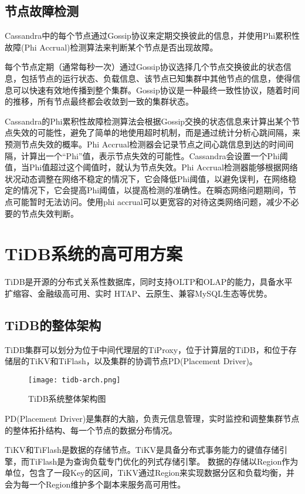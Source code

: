 \subsection{节点故障检测}

Cassandra中的每个节点通过Gossip协议来定期交换彼此的信息，并使用Phi累积性故障(Phi Accrual)检测算法\cite{hayashibara2004spl}来判断某个节点是否出现故障。

每个节点定期（通常每秒一次）通过Gossip协议选择几个节点交换彼此的状态信息，包括节点的运行状态、负载信息、该节点已知集群中其他节点的信息，使得信息可以快速有效地传播到整个集群。Gossip协议是一种最终一致性协议，随着时间的推移，所有节点最终都会收敛到一致的集群状态。

Cassandra的Phi累积性故障检测算法会根据Gossip交换的状态信息来计算出某个节点失效的可能性，避免了简单的地使用超时机制，而是通过统计分析心跳间隔，来预测节点失效的概率。Phi Accrual检测器会记录节点之间心跳信息到达的时间间隔，计算出一个“Phi”值，表示节点失效的可能性。Cassandra会设置一个Phi阈值，当Phi值超过这个阈值时，就认为节点失效。Phi Accrual检测器能够根据网络状况动态调整在网络不稳定的情况下，它会降低Phi阈值，以避免误判，在网络稳定的情况下，它会提高Phi阈值，以提高检测的准确性。在瞬态网络问题期间，节点可能暂时无法访问。使用phi accrual可以更宽容的对待这类网络问题，减少不必要的节点失效判断。


\section{TiDB系统的高可用方案}
TiDB\cite{huang2020tidb}是开源的分布式关系性数据库，同时支持OLTP和OLAP的能力，具备水平扩缩容、金融级高可用、实时 HTAP、云原生、兼容MySQL生态等优势。

\subsection{TiDB的整体架构}

TiDB集群可以划分为位于中间代理层的TiProxy，位于计算层的TiDB，和位于存储层的TiKV和TiFlash，以及集群的协调节点PD(Placement Driver)。

\begin{figure}
  \centering
  \texttt{[image: tidb-arch.png]}
  \caption{TiDB系统整体架构图}
  \label{fig:tidb-arch}
\end{figure}

PD(Placement Driver)是集群的大脑，负责元信息管理，实时监控和调整集群节点的整体拓扑结构、每一个节点的数据分布情况。

TiKV和TiFlash是数据的存储节点。TiKV是具备分布式事务能力的键值存储引擎，而TiFlash是为查询负载专门优化的列式存储引擎。
数据的存储以Region作为单位，包含了一段Key的区间，TiKV通过Region来实现数据分区和负载均衡，并会为每一个Region维护多个副本来服务高可用性。

